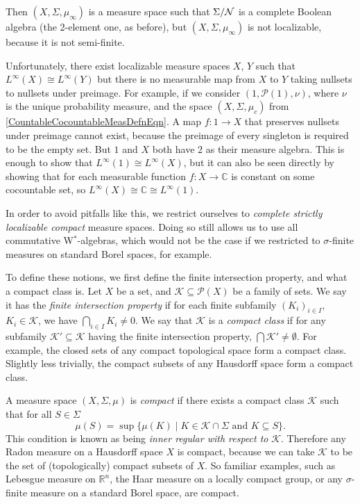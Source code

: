 \documentclass[reqno,T1]{amsproc}
\newcommand{\R}{\mathbb{R}}
\newcommand{\C}{\mathbb{C}}
\newcommand{\Kay}{\mathcal{K}} %
\newcommand{\powerset}[1]{\mathcal{P}(#1)}
\theoremstyle{plain}
\theoremstyle{remark}
\numberwithin{equation}{section}
\begin{document}
Then $(X,\Sigma,\mu_\infty)$ is a measure space such that $\Sigma / \mathcal{N}$ is a complete Boolean algebra (the 2-element one, as before), but $(X,\Sigma,\mu_\infty)$ is not localizable, because it is not semi-finite. 

Unfortunately, there exist localizable measure spaces $X$, $Y$ such that $L^\infty(X) \cong L^\infty(Y)$ but there is no measurable map from $X$ to $Y$ taking nullsets to nullsets under preimage. For example, if we consider $(1,\powerset{1},\nu)$, where $\nu$ is the unique probability measure, and the space $(X,\Sigma,\mu_c)$ from \eqref{CountableCocountableMeasDefnEqn}. A map $f: 1 \rightarrow X$ that preserves nullsets under preimage cannot exist, because the preimage of every singleton is required to be the empty set. But $1$ and $X$ both have $2$ as their measure algebra. This is enough to show that $L^\infty(1) \cong L^\infty(X)$, but it can also be seen directly by showing that for each measurable function $f : X \rightarrow \C$ is constant on some cocountable set, so $L^\infty(X) \cong \C \cong L^\infty(1)$. 

In order to avoid pitfalls like this, we restrict ourselves to \emph{complete strictly localizable compact} measure spaces. Doing so still allows us to use all commutative W$^*$-algebras, which would not be the case if we restricted to $\sigma$-finite measures on standard Borel spaces, for example.

To define these notions, we first define the finite intersection property, and what a compact class is. Let $X$ be a set, and $\Kay \subseteq \powerset{X}$ be a family of sets. We say it has the \emph{finite intersection property} if for each finite subfamily $(K_i)_{i \in I}$, $K_i \in \Kay$, we have $\bigcap_{i \in I} K_i \neq 0$. We say that $\Kay$ is a \emph{compact class} if for any subfamily $\Kay' \subseteq \Kay$ having the finite intersection property, $\bigcap \Kay' \neq \emptyset$. For example, the closed sets of any compact topological space form a compact class. Slightly less trivially, the compact subsets of any Hausdorff space form a compact class. 

A measure space $(X,\Sigma,\mu)$ is \emph{compact} \cite[342A(c)]{fremlin3} if there exists a compact class $\Kay$ such that for all $S \in \Sigma$
\[
\mu(S) = \sup \{ \mu(K) \mid K \in \Kay \cap \Sigma \text{ and } K \subseteq S \}.
\]
This condition is known as being \emph{inner regular with respect to} $\Kay$. Therefore any Radon measure on a Hausdorff space $X$ is compact, because we can take $\Kay$ to be the set of (topologically) compact subsets of $X$. So familiar examples, such as Lebesgue measure on $\R^n$, the Haar measure on a locally compact group, or any $\sigma$-finite measure on a standard Borel space, are compact.
\end{document}
